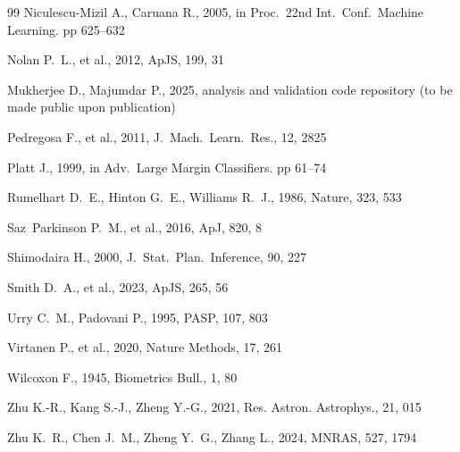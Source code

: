 \documentclass[fleqn,12pt]{article}
\begin{document}
\begin{thebibliography}{99}
Niculescu-Mizil A., Caruana R., 2005, in Proc.\ 22nd Int.\ Conf.\
  Machine Learning. pp 625--632

Nolan P.~L., et al., 2012, ApJS, 199, 31

Mukherjee D., Majumdar P., 2025, analysis and validation code repository
  (to be made public upon publication)

Pedregosa F., et al., 2011, J.\ Mach.\ Learn.\ Res., 12, 2825

Platt J., 1999, in Adv.\ Large Margin Classifiers. pp 61--74

Rumelhart D.~E., Hinton G.~E., Williams R.~J., 1986, Nature, 323, 533

Saz~Parkinson P.~M., et al., 2016, ApJ, 820, 8

Shimodaira H., 2000, J.\ Stat.\ Plan.\ Inference, 90, 227

Smith D.~A., et al., 2023, ApJS, 265, 56

Urry C.~M., Padovani P., 1995, PASP, 107, 803

Virtanen P., et al., 2020, Nature Methods, 17, 261

Wilcoxon F., 1945, Biometrics Bull., 1, 80

Zhu K.-R., Kang S.-J., Zheng Y.-G., 2021, Res. Astron. Astrophys., 21, 015

Zhu K.~R., Chen J.~M., Zheng Y.~G., Zhang L., 2024, MNRAS, 527, 1794

\end{thebibliography}
\end{document}
